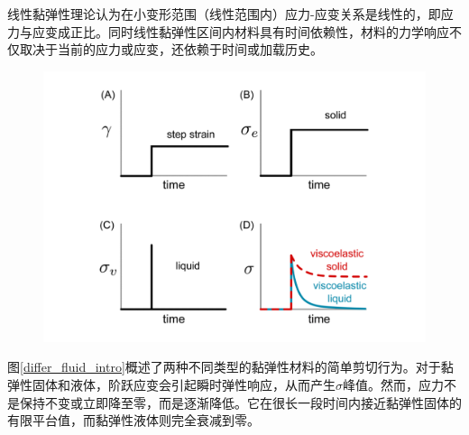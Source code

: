 线性黏弹性理论认为在小变形范围（线性范围内）应力-应变关系是线性的，即应力与应变成正比。同时线性黏弹性区间内材料具有时间依赖性，材料的力学响应不仅取决于当前的应力或应变，还依赖于时间或加载历史。
\begin{figure}[htbp]
  \centering
  \includegraphics[width=\textwidth]{Fig/solid_liquid.pdf}
\end{figure}
图\ref{differ_fluid_intro}概述了两种不同类型的黏弹性材料的简单剪切行为。对于黏弹性固体和液体，阶跃应变会引起瞬时弹性响应，从而产生$\sigma$峰值。然而，应力不是保持不变或立即降至零，而是逐渐降低。它在很长一段时间内接近黏弹性固体的有限平台值，而黏弹性液体则完全衰减到零\cite{ricarteTutorialReviewLinear2024}。

